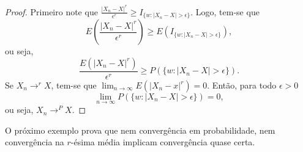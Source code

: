 %
\begin{frame}
\begin{proof}
%
%
Primeiro note que $\frac{|X_n-X|^r}{\epsilon^r}\geq
I_{\{w:|X_n-X|> \epsilon\}}$. Logo, tem-se que
$$E(\frac{|X_n-X|^r}{\epsilon^r})\geq E(I_{\{w:|X_n-X|> \epsilon\}}),$$
ou seja,
$$\frac{E(|X_n-X|^r)}{\epsilon^r}\geq P(\{w:|X_n-X|> \epsilon\}).$$
Se $X_n\rightarrow^r X$, tem-se que
$\lim_{n\rightarrow\infty}E(|X_n-x|^r)=0$. Então, para todo
$\epsilon>0$
$$\lim_{n\rightarrow\infty}P(\{w:|X_n-X|> \epsilon\})=0,$$
ou seja, $X_n\rightarrow^P X$. \end{proof}
%
%
%
%
O próximo exemplo prova que nem convergência em probabilidade, nem convergência na $r$-ésima média implicam convergência quase certa.
\end{frame}

